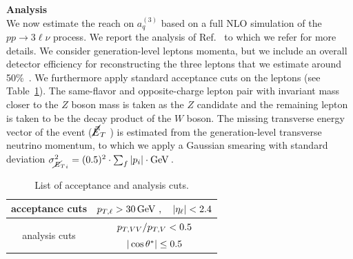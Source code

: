 \documentclass[../report.tex]{subfiles}
\begin{document}
\vspace{1cm}
\noindent
{\bf Analysis}\\
We now estimate the reach on $a_q^{(3)}$ based on a full NLO simulation of the $pp \to 3\ell\nu$ process. We report the analysis
of Ref.~\cite{Franceschini:2017ab} to which we refer for more details.
We consider generation-level leptons momenta, but we include an overall detector efficiency for reconstructing the three leptons that we estimate around 50\%~\cite{ATLAS:2016iqc}. We furthermore apply standard acceptance cuts on the leptons (see Table~\ref{tab:cuts}).
The same-flavor and opposite-charge lepton pair with invariant mass closer to the $Z$ boson mass is taken as the $Z$ candidate and the remaining lepton  is taken to be the decay product of the $W$ boson. The missing transverse energy vector of the event ($\cancel{\vec{E}}_T$ ) is estimated from the generation-level transverse neutrino momentum, to which we apply a Gaussian smearing with standard deviation
$ \sigma_{{\met}_{i}}^2 = (0.5)^2 \cdot \sum_f |p_i| \cdot {\rm{GeV}}\,$.

\begin{table}
\centering
\begin{tabular}{c|c}
acceptance cuts &
$p_{T,\ell}>30 \,\mathrm{GeV} \ ,\quad |\eta_{\ell}|<2.4$\\
\hline
\multirow{2}{*}{analysis cuts} &
$\deltapt/p_{T,V}<%
0.5$\\
& $|\cos \thetastar| \leq %
0.5$
\end{tabular}
\caption{List of acceptance and analysis cuts.}\label{tab:cuts}
\end{table}
\end{document}
